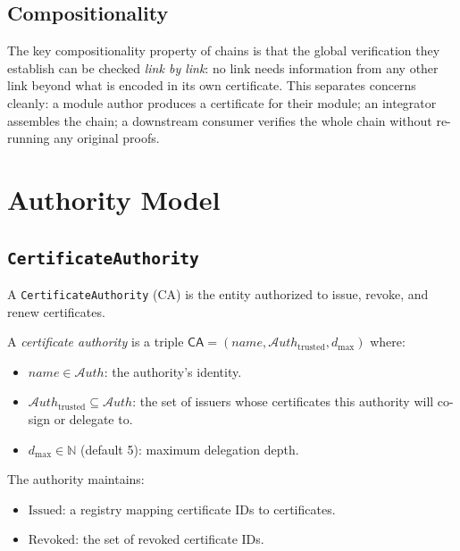 \documentclass[11pt]{article}
\newcommand{\CA}{\mathsf{CA}}                  %
\newcommand{\Issued}{\mathrm{Issued}}          %
\newcommand{\Revoked}{\mathrm{Revoked}}        %
\newcommand{\AuthSet}{\mathcal{A}\!\mathit{uth}} %
\begin{document}
\subsection{Compositionality}

The key compositionality property of chains is that the global
verification they establish can be checked \emph{link by link}:
no link needs information from any other link beyond what is
encoded in its own certificate.
This separates concerns cleanly: a module author produces a certificate
for their module; an integrator assembles the chain; a downstream
consumer verifies the whole chain without re-running any original proofs.

\section{Authority Model}\label{sec:authority}

\subsection{\texttt{CertificateAuthority}}

A \texttt{CertificateAuthority} (CA) is the entity authorized to issue,
revoke, and renew certificates.

\begin{definition}\label{def:ca}
A \emph{certificate authority} is a triple
$\CA = (\mathit{name}, \AuthSet_{\mathrm{trusted}}, d_{\max})$
where:
\begin{itemize}
  \item $\mathit{name} \in \AuthSet$: the authority's identity.
  \item $\AuthSet_{\mathrm{trusted}} \subseteq \AuthSet$: the set of
        issuers whose certificates this authority will co-sign or delegate to.
  \item $d_{\max} \in \mathbb{N}$ (default 5): maximum delegation depth.
\end{itemize}
The authority maintains:
\begin{itemize}
  \item $\Issued$: a registry mapping certificate IDs to certificates.
  \item $\Revoked$: the set of revoked certificate IDs.
\end{itemize}
\end{definition}
\end{document}
